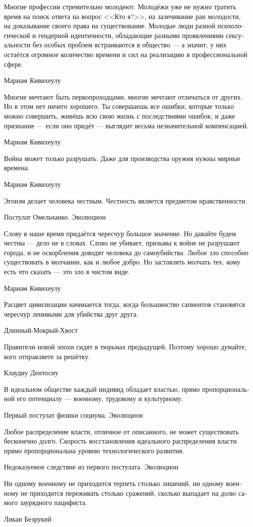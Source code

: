 \documentclass[a4paper,12pt,fleqn]{book}\usepackage{cooltooltips}\usepackage{polyglossia}\setdefaultlanguage[babelshorthands=true]{russian}\setotherlanguage{english}\defaultfontfeatures{Ligatures=TeX,Mapping=tex-text} \usepackage{xcolor}\definecolor{lightgray}{HTML}{bbbbbb}\color{lightgray}\newcommand{\ml}[3]{\textenglish{\textcolor{black}{#3}}}
\begin{document}
{\epigraph
{Многие профессии стремительно молодеют.
Молодёжи уже не нужно тратить время на поиск ответа на вопрос <<Кто я?>>, на залечивание ран молодости, на доказывание своего права на существование.
Молодые люди разной психологической и гендерной идентичности, обладающие разными проявлениями сексуальности без особых проблем встраиваются в общество --- а значит, у них остаётся огромное количество времени и сил на реализацию в профессиональной сфере.}
{Мариам Кивихеулу}

\epigraph
{Многие мечтают быть первопроходцами, многие мечтают отличаться от других.
Но в этом нет ничего хорошего.
Ты совершаешь все ошибки, которые только можно совершить, живёшь всю свою жизнь с последствиями ошибок, и даже признание --- если оно придёт --- выглядит весьма незначительной компенсацией.}
{Мариам Кивихеулу}

\epigraph
{Война может только разрушать.
Даже для производства оружия нужны мирные времена.}
{Мариам Кивихеулу}

\epigraph
{Эгоизм делает человека честным.
Честность является предметом нравственности.}
{Постулат Омельчанко.
Эволюцион}

\epigraph
{Слову в наше время придаётся чересчур большое значение.
Но давайте будем честны --- дело не в словах.
Слово не убивает, призывы к войне не разрушают города,  и не оскорбления доводят человека до самоубийства.
Любое зло способно существовать в молчании, как и любое добро.
Но заставлять молчать тех, кому есть что сказать --- это зло в чистом виде.}
{Мариам Кивихеулу}

\epigraph
{Расцвет цивилизации начинается тогда, когда большинство сапиентов становятся чересчур ленивыми для убийства друг друга.}
{Длинный-Мокрый-Хвост}

\epigraph
{Правители новой эпохи сидят в тюрьмах предыдущей.
Поэтому хорошо думайте, кого отправляете за решётку.}
{Клаудиу Дентосиу}

\epigraph
{В идеальном обществе каждый индивид обладает властью, прямо пропорциональной его потенциалу --- военному, трудовому и культурному.}
{Первый постулат физики социума. Эволюцион}

\epigraph
{Любое распределение власти, отличное от описанного, не может существовать бесконечно долго.
Скорость восстановления идеального распределения власти прямо пропорциональна уровню технологического развития.}
{Недоказуемое следствие из первого постулата. Эволюцион}

\epigraph
{Ни одному военному не приходится терпеть столько лишений, ни одному военному не приходится переживать столько сражений, сколько выпадает на долю самого заурядного пацифиста.}
{Ликан Безрукий}

}
\end{document}
